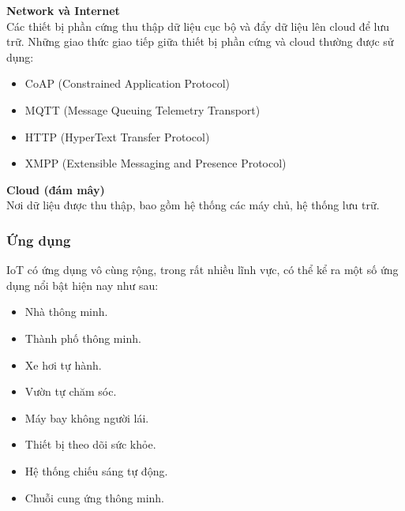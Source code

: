\documentclass[a4paper,12pt,oneside]{article}
\begin{document}
\noindent \textbf{Network và Internet}\\
\noindent Các thiết bị phần cứng thu thập dữ liệu cục bộ và đẩy dữ liệu lên cloud để lưu trữ. Những giao thức giao tiếp giữa thiết bị phần cứng và cloud thường được sử dụng:
\begin{itemize}
	\item CoAP (Constrained Application Protocol)
	\item MQTT (Message Queuing Telemetry Transport)
	\item HTTP (HyperText Transfer Protocol)
	\item XMPP (Extensible Messaging and Presence Protocol)
\end{itemize}

\noindent \textbf{Cloud (đám mây)}\\
\noindent Nơi dữ liệu được thu thập, bao gồm hệ thống các máy chủ, hệ thống lưu trữ.

\subsubsection{Ứng dụng}

\noindent IoT có ứng dụng vô cùng rộng, trong rất nhiều lĩnh vực, có thể kể ra một số ứng dụng nổi bật hiện nay như sau:
\begin{itemize}
\item Nhà thông minh.
\item Thành phố thông minh.
\item Xe hơi tự hành.
\item Vườn tự chăm sóc.
\item Máy bay không người lái.
\item Thiết bị theo dõi sức khỏe.
\item Hệ thống chiếu sáng tự động.
\item Chuỗi cung ứng thông minh.
\end{itemize}
\end{document}
